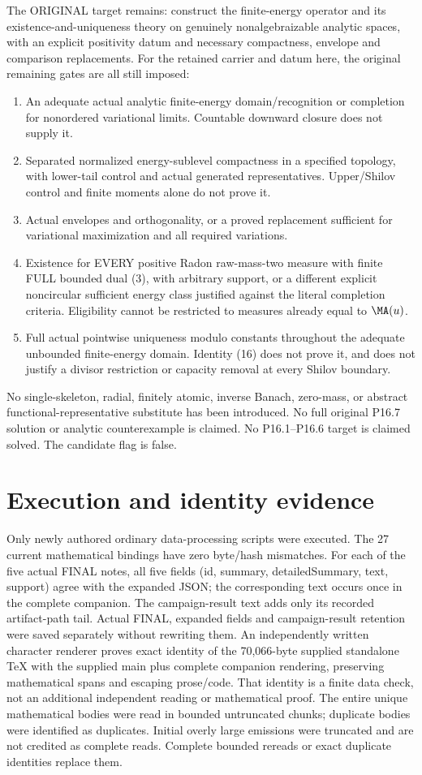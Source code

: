 The ORIGINAL target remains: construct the finite-energy operator and its
existence-and-uniqueness theory on genuinely nonalgebraizable analytic spaces,
with an explicit positivity datum and necessary compactness, envelope and
comparison replacements. For the retained carrier and datum here, the original
remaining gates are all still imposed:
\begin{enumerate}
\item An adequate actual analytic finite-energy domain/recognition or completion
for nonordered variational limits. Countable downward closure does not supply it.
\item Separated normalized energy-sublevel compactness in a specified topology,
with lower-tail control and actual generated representatives. Upper/Shilov
control and finite moments alone do not prove it.
\item Actual envelopes and orthogonality, or a proved replacement sufficient
for variational maximization and all required variations.
\item Existence for EVERY positive Radon raw-mass-two measure with finite FULL
bounded dual (3), with arbitrary support, or a different explicit noncircular
sufficient energy class justified against the literal completion criteria.
Eligibility cannot be restricted to measures already equal to $\MA(u)$.
\item Full actual pointwise uniqueness modulo constants throughout the adequate
unbounded finite-energy domain. Identity (16) does not prove it, and does not
justify a divisor restriction or capacity removal at every Shilov boundary.
\end{enumerate}
No single-skeleton, radial, finitely atomic, inverse Banach, zero-mass, or
abstract functional-representative substitute has been introduced.
No full original P16.7 solution or analytic counterexample is claimed.
No P16.1--P16.6 target is claimed solved. The candidate flag is false.

\section{Execution and identity evidence}
Only newly authored ordinary data-processing scripts were executed.
The 27 current mathematical bindings have zero byte/hash mismatches.
For each of the five actual FINAL notes, all five fields (id, summary,
detailedSummary, text, support) agree with the expanded JSON; the corresponding
text occurs once in the complete companion. The campaign-result text adds
only its recorded artifact-path tail. Actual FINAL, expanded fields and
campaign-result retention were saved separately without rewriting them.
An independently written character renderer proves exact identity of the
70,066-byte supplied standalone TeX with the supplied main plus complete
companion rendering, preserving mathematical spans and escaping prose/code.
That identity is a finite data check, not an additional independent reading
or mathematical proof. The entire unique mathematical bodies were read in
bounded untruncated chunks; duplicate bodies were identified as duplicates.
Initial overly large emissions were truncated and are not credited as complete
reads. Complete bounded rereads or exact duplicate identities replace them.

